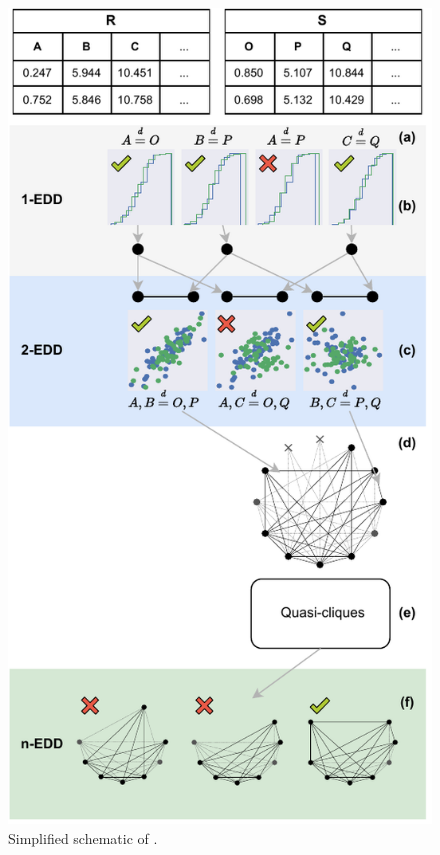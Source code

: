 \begin{multicols}{2}

\begin{figure}[H]
    \centering
    \includegraphics[width=\linewidth]{images/5_presq/pipeline}
    \caption{Simplified schematic of \PresQ.}
    \label{fig:presq_pipeline}
\end{figure}


\end{multicols}
